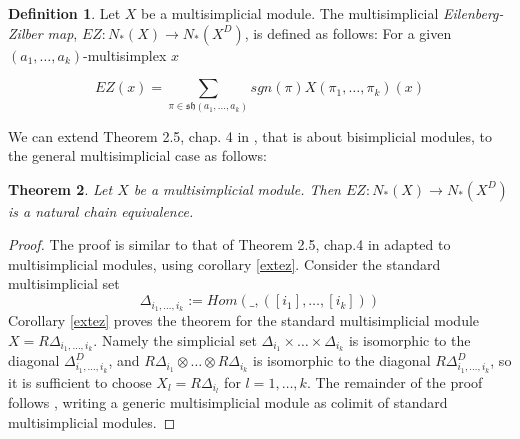 \documentclass[a4paper,11pt]{article}
\newtheorem{theorem}{Theorem}[section]
\theoremstyle{remark}
\theoremstyle{definition}
\newtheorem{definition}[theorem]{Definition}
\begin{document}
\begin{definition}%
Let $X$ be a multisimplicial module.
The multisimplicial \textit{Eilenberg-Zilber map}, $\mathit{EZ}:N_*(X)\rightarrow N_*(X^{D})$, is defined as follows:
For a given $(a_{1},\dots,a_{k})$-multisimplex $x$



	\begin{equation*}
	\label{EZ}
	\mathit{EZ}(x) = 	\sum_{\pi \in \mathfrak{sh}(a_{1},\dots,a_{k})} {sgn(\pi)} X(\pi_{1}, \dots, \pi_k) (x)   
	\end{equation*}
	
\end{definition}
We can extend Theorem 2.5, chap. 4 in \cite{GJ}, that is about bisimplicial modules, to the general multisimplicial case as follows:
\begin{theorem}
	\label{generalGJtheorem}
Let $X$ be a multisimplicial module.  Then $EZ: N_*(X) \to N_*(X^D)$ 
is a natural chain equivalence.
\end{theorem}
\begin{proof}
The proof is similar to that of Theorem 2.5, chap.4 in \cite{GJ} adapted to multisimplicial modules, using corollary \ref{extez}.
Consider 
the standard multisimplicial set $$\Delta_{i_1,\dots,i_k} := Hom(\_,([i_1],\dots,[i_k]))$$
Corollary \ref{extez} proves the theorem
for the standard multisimplicial module $X= R  \Delta_{i_1,\dots,i_k}$.
Namely the simplicial set  $\Delta_{i_1} \times \dots \times \Delta_{i_k}$ is isomorphic to the diagonal $\Delta_{i_1,\dots,i_k}^D$, and 
$R\Delta_{i_1} \otimes \dots \otimes R\Delta_{i_k}$ is isomorphic to the diagonal $R\Delta_{i_1,\dots,i_k}^D$, so it is sufficient to 
choose $X_l=R\Delta_{i_l}$ for $l=1,\dots,k$.
The remainder of the proof follows \cite{GJ}, writing a generic multisimplicial module as colimit of standard multisimplicial modules. 
\end{proof}
\end{document}
